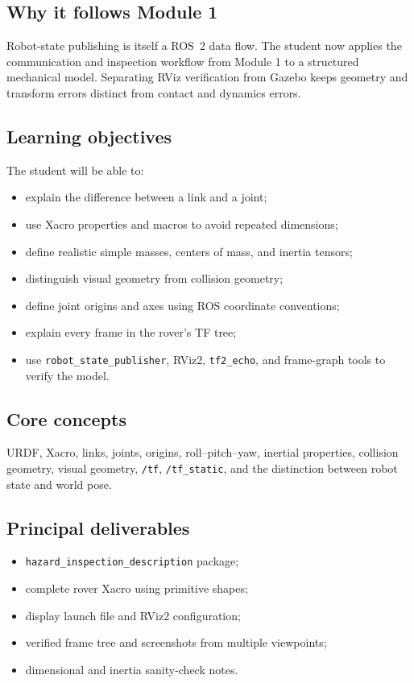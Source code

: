 \documentclass[11pt]{article}
\begin{document}
\subsection{Why it follows Module 1}

Robot-state publishing is itself a ROS~2 data flow. The student now applies the
communication and inspection workflow from Module 1 to a structured mechanical
model. Separating RViz verification from Gazebo keeps geometry and transform
errors distinct from contact and dynamics errors.

\subsection{Learning objectives}

The student will be able to:

\begin{itemize}
  \item explain the difference between a link and a joint;
  \item use Xacro properties and macros to avoid repeated dimensions;
  \item define realistic simple masses, centers of mass, and inertia tensors;
  \item distinguish visual geometry from collision geometry;
  \item define joint origins and axes using ROS coordinate conventions;
  \item explain every frame in the rover's TF tree;
  \item use \texttt{robot\_state\_publisher}, RViz2, \texttt{tf2\_echo}, and
        frame-graph tools to verify the model.
\end{itemize}

\subsection{Core concepts}

URDF, Xacro, links, joints, origins, roll--pitch--yaw, inertial properties,
collision geometry, visual geometry, \texttt{/tf}, \texttt{/tf\_static}, and
the distinction between robot state and world pose.

\subsection{Principal deliverables}

\begin{itemize}
  \item \texttt{hazard\_inspection\_description} package;
  \item complete rover Xacro using primitive shapes;
  \item display launch file and RViz2 configuration;
  \item verified frame tree and screenshots from multiple viewpoints;
  \item dimensional and inertia sanity-check notes.
\end{itemize}
\end{document}
